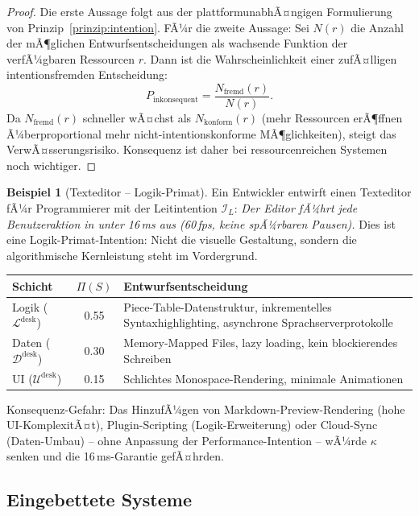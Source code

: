 ﻿\documentclass[a4paper,12pt]{article}
\theoremstyle{definition}
\newtheorem{beispiel}{Beispiel}
\begin{document}
\begin{proof}
Die erste Aussage folgt aus der plattformunabhÃ¤ngigen Formulierung von
Prinzip~\ref{prinzip:intention}. FÃ¼r die zweite Aussage: Sei $N(r)$
die Anzahl der mÃ¶glichen Entwurfsentscheidungen als wachsende Funktion
der verfÃ¼gbaren Ressourcen $r$. Dann ist die Wahrscheinlichkeit einer
zufÃ¤lligen intentionsfremden Entscheidung:
\[
P_{\text{inkonsequent}} = \frac{N_{\text{fremd}}(r)}{N(r)}.
\]
Da $N_{\text{fremd}}(r)$ schneller wÃ¤chst als $N_{\text{konform}}(r)$
(mehr Ressourcen erÃ¶ffnen Ã¼berproportional mehr nicht-intentionskonforme
MÃ¶glichkeiten), steigt das VerwÃ¤sserungsrisiko. Konsequenz ist daher
bei ressourcenreichen Systemen noch wichtiger.
\end{proof}

\begin{beispiel}[Texteditor -- Logik-Primat]\label{bsp:texteditor}
Ein Entwickler entwirft einen Texteditor fÃ¼r Programmierer mit der
Leitintention $\mathcal{I}_L$: \textit{\glqq{}Der Editor fÃ¼hrt jede
Benutzeraktion in unter 16\,ms aus (60\,fps, keine spÃ¼rbaren Pausen).\grqq{}}
Dies ist eine Logik-Primat-Intention: Nicht die visuelle Gestaltung,
sondern die algorithmische Kernleistung steht im Vordergrund.

\begin{center}
\begin{tabular}{lcp{5.5cm}}
\toprule
Schicht & $\Pi(S)$ & Entwurfsentscheidung \\
\midrule
Logik ($\mathcal{L}^{\text{desk}}$) & 0.55 & Piece-Table-Datenstruktur,
inkrementelles Syntaxhighlighting, asynchrone Sprachserverprotokolle \\
Daten ($\mathcal{D}^{\text{desk}}$) & 0.30 & Memory-Mapped Files, lazy
loading, kein blockierendes Schreiben \\
UI ($\mathcal{U}^{\text{desk}}$) & 0.15 & Schlichtes Monospace-Rendering,
minimale Animationen \\
\bottomrule
\end{tabular}
\end{center}

Konsequenz-Gefahr: Das HinzufÃ¼gen von Markdown-Preview-Rendering (hohe
UI-KomplexitÃ¤t), Plugin-Scripting (Logik-Erweiterung) oder Cloud-Sync
(Daten-Umbau) -- ohne Anpassung der Performance-Intention -- wÃ¼rde
$\kappa$ senken und die 16\,ms-Garantie gefÃ¤hrden.
\end{beispiel}

\subsection{Eingebettete Systeme}
\end{document}
